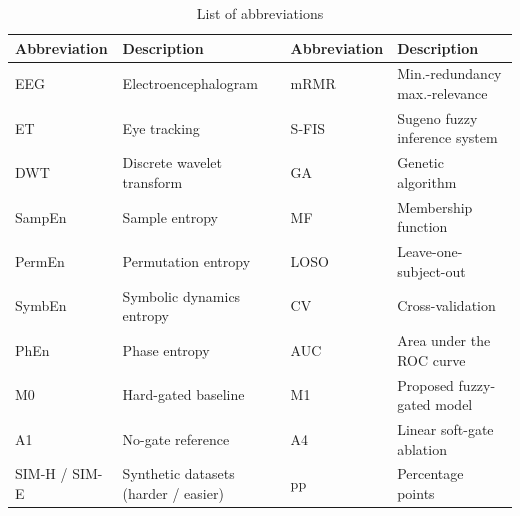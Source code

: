 \documentclass[11pt,a4paper]{article}
\begin{document}
\begin{table}[t]
\centering\small
\caption{List of abbreviations}\label{tab:abbr}
\begin{tabular}{@{}ll@{\hspace{2em}}ll@{}}
\toprule
Abbreviation & Description & Abbreviation & Description\\
\midrule
EEG & Electroencephalogram & mRMR & Min.-redundancy max.-relevance\\
ET & Eye tracking & S-FIS & Sugeno fuzzy inference system\\
DWT & Discrete wavelet transform & GA & Genetic algorithm\\
SampEn & Sample entropy & MF & Membership function\\
PermEn & Permutation entropy & LOSO & Leave-one-subject-out\\
SymbEn & Symbolic dynamics entropy & CV & Cross-validation\\
PhEn & Phase entropy & AUC & Area under the ROC curve\\
M0 & Hard-gated baseline & M1 & Proposed fuzzy-gated model\\
A1 & No-gate reference & A4 & Linear soft-gate ablation\\
SIM-H / SIM-E & Synthetic datasets (harder / easier) & pp & Percentage points\\
\bottomrule
\end{tabular}
\end{table}

\end{document}
